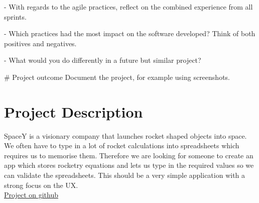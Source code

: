 \documentclass[14]{article}
\begin{document}
- With regards to the agile practices, reflect on the combined experience from all sprints.

- Which practices had the most impact on the software developed?
  Think of both positives and negatives.

- What would you do differently in a future but similar project?


# Project outcome
Document the project, for example using screenshots.
\fi

\section{Project Description}
SpaceY is a visionary company that launches rocket shaped objects into space. We often have to type in a lot of rocket calculations into spreadsheets which requires us to memorise them. Therefore we are looking for someone to create an app which stores rocketry equations and lets us type in the required values so we can validate the spreadsheets. This should be a very simple application with a strong focus on the UX.
\\
\href{https://github.com/Owlinated/adp_project}{Project on github}

\section{}
\end{document}
